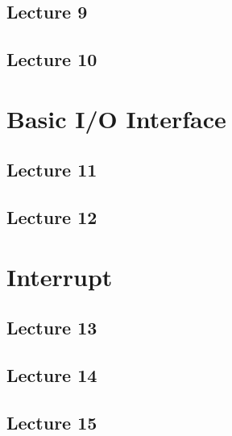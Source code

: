 \documentclass{book}
\begin{document}
\chapter{Lecture 9}


\chapter{Lecture 10}


\part{Basic I/O Interface}
\chapter{Lecture 11}


\chapter{Lecture 12}


\part{Interrupt}
\chapter{Lecture 13}


\chapter{Lecture 14}


\chapter{Lecture 15}

\end{document}
